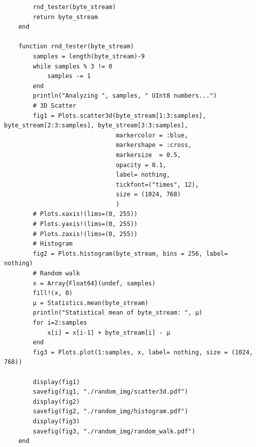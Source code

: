 \documentclass[10pt, final]{article}
\begin{document}
\begin{mdframed}
\begin{lstlisting}
        rnd_tester(byte_stream)
        return byte_stream
    end
    
    function rnd_tester(byte_stream)
        samples = length(byte_stream)-9
        while samples % 3 != 0
            samples -= 1
        end
        println("Analyzing ", samples, " UInt8 numbers...")
        # 3D Scatter
        fig1 = Plots.scatter3d(byte_stream[1:3:samples], byte_stream[2:3:samples], byte_stream[3:3:samples], 
                               markercolor = :blue,
                               markershape = :cross,
                               markersize  = 0.5,
                               opacity = 0.1,
                               label= nothing,
                               tickfont=("times", 12),
                               size = (1024, 768)
                               )  
        # Plots.xaxis!(lims=(0, 255))
        # Plots.yaxis!(lims=(0, 255))
        # Plots.zaxis!(lims=(0, 255))
        # Histogram
        fig2 = Plots.histogram(byte_stream, bins = 256, label= nothing)
        # Random walk
        x = Array{Float64}(undef, samples)
        fill!(x, 0)
        μ = Statistics.mean(byte_stream)
        println("Statistical mean of byte_stream: ", μ)
        for i=2:samples
            x[i] = x[i-1] + byte_stream[i] - μ
        end
        fig3 = Plots.plot(1:samples, x, label= nothing, size = (1024, 768))
    
        display(fig1)
        savefig(fig1, "./random_img/scatter3d.pdf")
        display(fig2)
        savefig(fig2, "./random_img/histogram.pdf")
        display(fig3)
        savefig(fig3, "./random_img/random_walk.pdf")
    end
    \end{lstlisting}
\end{mdframed} 
\end{document}
